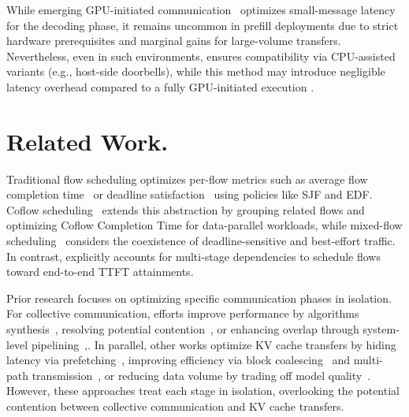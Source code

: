  While emerging GPU-initiated communication~\cite{nvidia_nvshmem_ibgda,deepseek_deepep_2024} optimizes small-message latency for the decoding phase, it remains uncommon in prefill deployments due to strict hardware prerequisites and marginal gains for large-volume transfers. Nevertheless, even in such environments, \sys ensures compatibility via CPU-assisted variants (e.g., host-side doorbells), while this method may introduce negligible latency overhead compared to a fully GPU-initiated execution \cite{nvidia_magnum_nvshmem3}.

\section{Related Work.}

Traditional flow scheduling optimizes per-flow metrics such as average flow completion time~\cite{dctcp,dcqcn,pfabric,PDQ,pias,li2017rate,li2024flow} or deadline satisfaction~\cite{D3,d2tcp,PDQ,zhang2015guaranteeing} using policies like SJF and EDF.
Coflow scheduling~\cite{varys,Aalo,zhang2016coda,zhao2015rapier,susanto2016stream,agarwal2018sincronia,wan2025coflow} extends this abstraction by grouping related flows and optimizing Coflow Completion Time for data-parallel workloads, while mixed-flow scheduling~\cite{karuna} considers the coexistence of deadline-sensitive and best-effort traffic. In contrast, \sys{} explicitly accounts for multi-stage dependencies to schedule flows toward end-to-end TTFT attainments.

 Prior research focuses on optimizing specific communication phases in isolation. For collective communication, efforts improve performance by algorithms synthesis~\cite{shah2023taccl,cao2025syccl}, resolving  potential contention~\cite{cao2024crux,rajasekaran2024cassini}, or enhancing overlap through system-level pipelining~\cite{comet,zheng2025triton,hong2025flashoverlap},. In parallel, other works optimize KV cache transfers by hiding latency via prefetching~\cite{mooncakefast,splitwise}, improving efficiency via block coalescing~\cite{li2025flowkv,chen2024kvdirect} and multi-path transmission~\cite{wu2026dualpath}, or reducing data volume by trading off model quality~\cite{cachegen}. However, these approaches treat each stage in isolation, overlooking the potential contention between collective communication and KV cache transfers.

